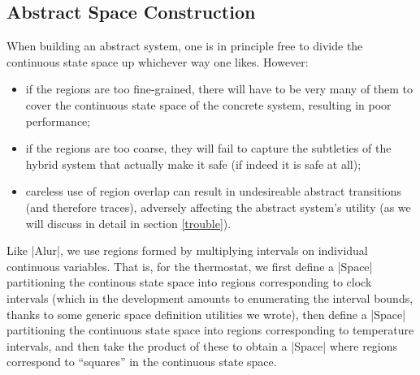 \documentclass[runningheads]{llncs}
\begin{document}


\subsection{Abstract Space Construction}
\label{abs.space.constr}

When building an abstract system, one is in principle free to divide the continuous state space up whichever way one likes. However:
\begin{itemize}
\item if the regions are too fine-grained, there will have to be very many of them to cover the continuous state space of the concrete system, resulting in poor performance;
\item if the regions are too coarse, they will fail to capture the subtleties of the hybrid system that actually make it safe (if indeed it is safe at all);
\item careless use of region overlap can result in undesireable abstract transitions (and therefore traces), adversely affecting the abstract system's utility (as we will discuss in detail in section \ref{trouble}).
\end{itemize}

Like |Alur|, we use regions formed by multiplying intervals on individual continuous variables. That is, for the thermostat, we first define a |Space| partitioning the continous state space into regions corresponding to clock intervals (which in the development amounts to enumerating the interval bounds, thanks to some generic space definition utilities we wrote), then define a |Space| partitioning the continuous state space into regions corresponding to temperature intervals, and then take the product of these to obtain a |Space| where regions correspond to ``squares'' in the continuous state space.

\end{document}
